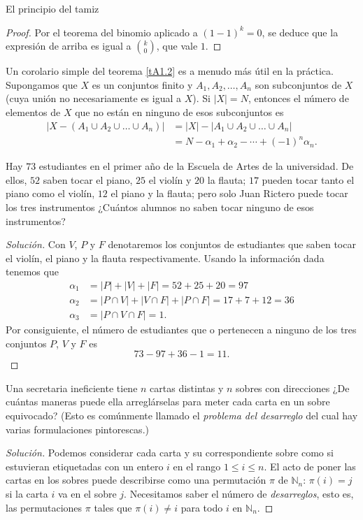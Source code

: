 \begin{section}{El principio del tamiz}
\begin{proof}
Por el teorema del binomio aplicado a $(1-1)^k=0$, se deduce que la expresión de arriba  es igual a
$\binom{k}{0}$, que vale $1$.
\end{proof}

Un corolario simple del teorema \ref{tA1.2} es a menudo más útil en la práctica. Supongamos que $X$ es un conjuntos finito y $A_1,A_2,\ldots,A_n$ son subconjuntos de $X$ (cuya unión no necesariamente es igual a $X$). Si $|X| = N$, entonces el número de elementos de $X$ que no están en ninguno de esos subconjuntos es
$$\begin{aligned}
|X-(A_1 \cup A_2 \cup \ldots \cup A_n)|&=
|X|-|A_1 \cup A_2 \cup \ldots \cup A_n| \\
&= N- \alpha_1 + \alpha_2 - \cdots + (-1)^n\alpha_n.
\end{aligned}
$$

\begin{ejemplo*} Hay $73$ estudiantes en el primer año de la Escuela de Artes de la universidad. De ellos, $52$ saben tocar el piano, $25$ el violín y $20$ la flauta; $17$ pueden tocar tanto el piano como el violín, $12$ el piano y la flauta; pero solo Juan Rictero puede tocar los tres instrumentos ¿Cuántos alumnos no saben tocar ninguno de esos instrumentos?
\end{ejemplo*}
\begin{proof}[Solución] Con $V$, $P$ y $F$ denotaremos los conjuntos de estudiantes que saben tocar el violín, el piano y la flauta respectivamente. Usando la información dada tenemos que $$
\begin{aligned}
\alpha_1&= |P| + |V| + |F|= 52+25+20=97 \\
\alpha_2&= |P\cap V| + |V\cap F| + |P\cap F|=17+7+12=36 \\
\alpha_3&= |P\cap V\cap F|= 1.
\end{aligned}
$$
Por consiguiente, el número de estudiantes que o pertenecen a ninguno de los tres conjuntos $P$, $V$ y $F$ es
$$
73-97+36-1=11.
$$
\end{proof}

\begin{ejemplo*} Una secretaria ineficiente tiene $n$ cartas distintas y $n$ sobres con direcciones ¿De cuántas maneras puede ella arreglárselas para meter cada carta en un sobre equivocado? (Esto es comúnmente llamado el \textit{problema del desarreglo} del cual hay varias formulaciones pintorescas.) 
\end{ejemplo*}


\begin{proof}[Solución] Podemos considerar cada carta y su correspondiente sobre  como si estuvieran etiquetadas con un entero $i$ en el rango $1 \le i \le n$. El acto de poner las cartas en los sobres puede describirse como una permutación $\pi$  de $\mathbb N_n$: $\pi(i)=j$ si la carta $i$ va en el sobre $j$. Necesitamos saber  el número de \textit{desarreglos}, esto es, las permutaciones $\pi$ tales que
$\pi(i)\not=i$ para todo $i$ en $\mathbb N_n$.


\end{proof}
\end{section}
